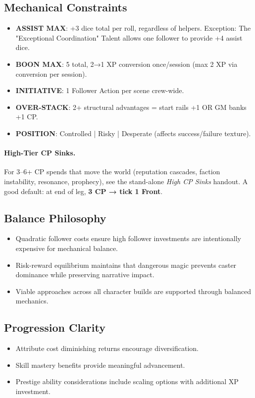\documentclass[11pt]{article}
\begin{document}
\subsection{Mechanical Constraints}
\begin{itemize}
    \item \textbf{ASSIST MAX}: +3 dice total per roll, regardless of helpers. Exception: The "Exceptional Coordination" Talent allows one follower to provide +4 assist dice.
    \item \textbf{BOON MAX}: 5 total, 2→1 XP conversion once/session (max 2 XP via conversion per session).
    \item \textbf{INITIATIVE}: 1 Follower Action per scene crew-wide.
    \item \textbf{OVER-STACK}: 2+ structural advantages = start rails +1 OR GM banks +1 CP.
    \item \textbf{POSITION}: Controlled | Risky | Desperate (affects success/failure texture).
\end{itemize}

\paragraph{High-Tier CP Sinks.}
For 3–6+ CP spends that move the world (reputation cascades, faction instability, resonance, prophecy), see the stand-alone \emph{High CP Sinks} handout. A good default: at end of leg, \textbf{3 CP → tick 1 Front}.

\subsection{Balance Philosophy}
\begin{itemize}
    \item Quadratic follower costs ensure high follower investments are intentionally expensive for mechanical balance.
    \item Risk-reward equilibrium maintains that dangerous magic prevents caster dominance while preserving narrative impact.
    \item Viable approaches across all character builds are supported through balanced mechanics.
\end{itemize}

\subsection{Progression Clarity}
\begin{itemize}
    \item Attribute cost diminishing returns encourage diversification.
    \item Skill mastery benefits provide meaningful advancement.
    \item Prestige ability considerations include scaling options with additional XP investment.
\end{itemize}
\end{document}
